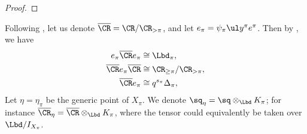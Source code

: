 \documentclass[11pt,reqno]{amsart}
\begin{document}
\begin{proof}

\end{proof}

Following \cite{kleshchev2013affine}, let us denote $\ol\CR=\CR/\CR_{>\pi}$, and let $e_\pi=\psi_\pi\ul y^\pi e^\pi$. Then by \cite[Theorem 5.23]{kleshchev2013affine}, we have 
    \begin{align*}
        e_\pi\ol\CR e_\pi&\cong\Lbd_\pi,\\
        \ol\CR e_\pi\ol\CR&\cong \CR_{\ge\pi}/\CR_{>\pi},\\
        \ol\CR e_\pi&\cong q^{s_\pi}\Delta_\pi,
    \end{align*}
    Let $\eta=\eta_\pi$ be the generic point of $X_\pi$. We denote $\sq_\eta=\sq\otimes_\Lbd K_\pi$; for instance $\ol\CR_{\eta}=\ol\CR\otimes_\Lbd K_\pi$, where the tensor could equivalently be taken over $\Lbd/I_{X_\pi}$.
\end{document}
